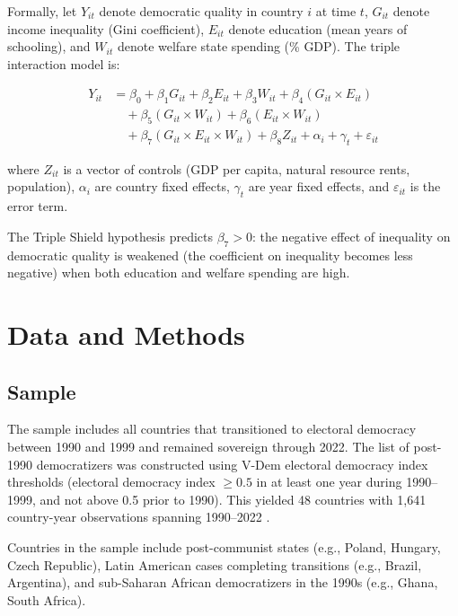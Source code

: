 \documentclass[11pt,letterpaper]{article}
\begin{document}
Formally, let $Y_{it}$ denote democratic quality in country $i$ at time $t$, $G_{it}$ denote income inequality (Gini coefficient), $E_{it}$ denote education (mean years of schooling), and $W_{it}$ denote welfare state spending (\% GDP). The triple interaction model is:

\begin{equation}
\begin{aligned}
Y_{it} &= \beta_0 + \beta_1 G_{it} + \beta_2 E_{it} + \beta_3 W_{it} + \beta_4 (G_{it} \times E_{it}) \\
&\quad + \beta_5 (G_{it} \times W_{it}) + \beta_6 (E_{it} \times W_{it}) \\
&\quad + \beta_7 (G_{it} \times E_{it} \times W_{it}) + \beta_8 Z_{it} + \alpha_i + \gamma_t + \varepsilon_{it}
\end{aligned}
\end{equation}

where $Z_{it}$ is a vector of controls (GDP per capita, natural resource rents, population), $\alpha_i$ are country fixed effects, $\gamma_t$ are year fixed effects, and $\varepsilon_{it}$ is the error term.

The Triple Shield hypothesis predicts $\beta_7 > 0$: the negative effect of inequality on democratic quality is weakened (the coefficient on inequality becomes less negative) when both education and welfare spending are high.

\section{Data and Methods}

\subsection{Sample}

The sample includes all countries that transitioned to electoral democracy between 1990 and 1999 and remained sovereign through 2022. The list of post-1990 democratizers was constructed using V-Dem electoral democracy index thresholds (electoral democracy index $\geq 0.5$ in at least one year during 1990--1999, and not above 0.5 prior to 1990). This yielded 48 countries with 1,641 country-year observations spanning 1990--2022 \cite{Coppedge2023}.

Countries in the sample include post-communist states (e.g., Poland, Hungary, Czech Republic), Latin American cases completing transitions (e.g., Brazil, Argentina), and sub-Saharan African democratizers in the 1990s (e.g., Ghana, South Africa).
\end{document}
